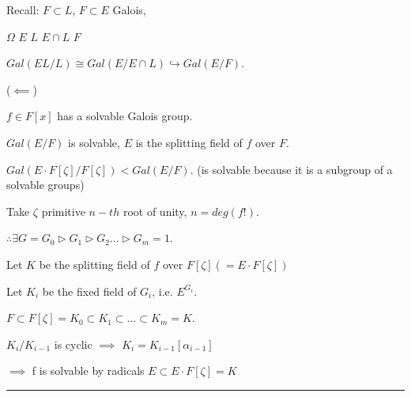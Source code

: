 \documentclass[twoside]{article}
\newcommand{\z}{\zeta}
\newcommand{\hra}{\hookrightarrow}
\newcommand{\trr}{\triangleright}
\newenvironment{proof}{{\bf Proof:}}{\hfill\rule{2mm}{2mm}}
\begin{document}
    \begin{proof}
        Recall: $F \subset L$, $F \subset E$ Galois, 

                    $\Omega$
        $E$                             $L$
                    $E \cap L$
                        $F$

        $Gal(EL/L) \cong Gal(E/E\cap L) \hra Gal(E/F)$. 

        ($\impliedby$)

        $f\in F[x]$ has a solvable Galois group. 

        $Gal(E/F)$ is solvable, $E$ is the splitting field of $f$ over $F$. 

        $Gal(E \cdot F[\z]/F[\z]) < Gal(E/F)$. (is solvable because it is a subgroup of a solvable groups)

        Take $\zeta$ primitive $n-th$ root of unity, $n = deg(f!)$. 

        $\therefore \exists G = G_0 \trr G_1 \trr G_2 \dots \trr G_m = {1}$. 

        Let $K$ be the splitting field of $f$ over $F[\zeta] (=E\cdot F[\zeta])$

        Let $K_i$ be the fixed field of $G_i$, i.e. $E^{G_i}$.
        
        $F \subset F[\zeta] = K_0 \subset K_1 \subset \dots \subset K_m = K$.

        $K_i/K_{i-1}$ is cyclic $\implies$ $K_i = K_{i-1}[\alpha_{i-1}]$

        $\implies $ f is solvable by radicals $E \subset E \cdot F[\zeta] = K$
    \end{proof}
\end{document}
